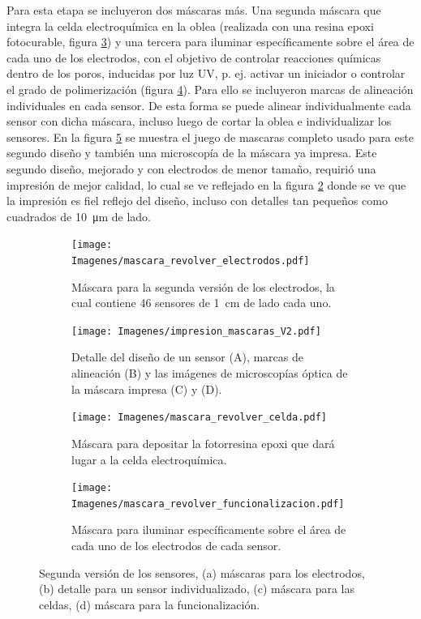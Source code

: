 {		     Para esta etapa se incluyeron dos máscaras más. Una segunda máscara que integra la celda electroquímica en la oblea (realizada con una resina epoxi fotocurable, figura \ref{fig:mascara_su8}) y una tercera para iluminar específicamente sobre el área de cada uno de los electrodos, con el objetivo de controlar reacciones químicas dentro de los poros, inducidas por luz UV, p. ej. activar un iniciador o controlar el grado de polimerización  (figura \ref{fig:mascara_funcionalizacion}).\cite{Andrieu-Brunsen2015,Herzog2015,Silies2015} Para ello se incluyeron marcas de alineación individuales en cada sensor. De esta forma se puede alinear individualmente cada sensor con dicha máscara, incluso luego de cortar la oblea e individualizar los sensores. En la figura \ref{fig:impresion_diseno_V2} se muestra el juego de mascaras completo usado para este segundo diseño y también una microscopía de la máscara ya impresa. Este segundo diseño, mejorado y con electrodos de menor tamaño, requirió una impresión de mejor calidad, lo cual se ve reflejado en la figura \ref{fig:impresion_diseno_v2_b} donde se ve que la impresión es fiel reflejo del diseño, incluso con detalles tan pequeños como cuadrados de \SI{10}{\um} de lado. 
	

					\begin{figure}[b!]
			 	   	    \centering
			 	   	    \begin{subfigure}[t]{0.495\textwidth}
			        	\texttt{[image: Imagenes/mascara\_revolver\_electrodos.pdf]}
			       		\caption{Máscara para la segunda versión de los electrodos, la cual contiene 46 sensores de \SI{1}{cm} de lado cada uno.}
			         	\label{fig:mascara_v2}
			     		\end{subfigure}
			     		\begin{subfigure}[t]{0.495\textwidth}
			     		\texttt{[image: Imagenes/impresion\_mascaras\_V2.pdf]}
			    		\caption{Detalle del diseño de un sensor (A), marcas de alineación (B) y las imágenes de microscopías óptica de la máscara impresa (C) y (D).}
			    		\label{fig:impresion_diseno_v2_b}	
						\end{subfigure}
			     		\begin{subfigure}[t]{0.495\textwidth}
			         	\texttt{[image: Imagenes/mascara\_revolver\_celda.pdf]}
			        	\caption{Máscara para depositar la fotorresina epoxi que dará lugar a la celda electroquímica.}
			         	\label{fig:mascara_su8}
			     		\end{subfigure}
						\begin{subfigure}[t]{0.495\textwidth}
			     		\texttt{[image: Imagenes/mascara\_revolver\_funcionalizacion.pdf]}
			        	\caption{Máscara para iluminar específicamente sobre el área de cada uno de los electrodos de cada sensor.}
			         	\label{fig:mascara_funcionalizacion}
			     		\end{subfigure}
			     		\caption[Juego de máscara. Segunda versión]{Segunda versión de los sensores, (a) máscaras  para los electrodos, (b) detalle para un sensor individualizado, (c) máscara para las celdas, (d) máscara para la funcionalización.}
			     		\label{fig:impresion_diseno_V2}
			     	   	\end{figure}
					
}
